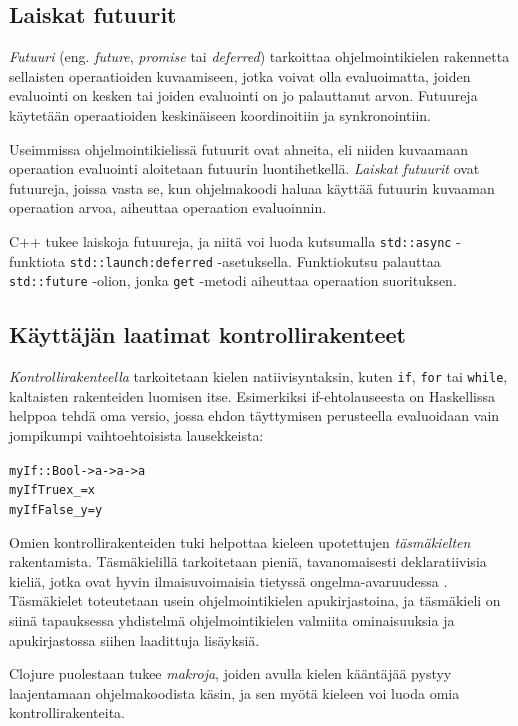 \subsection{Laiskat futuurit}
\textit{Futuuri} (eng. \textit{future}, \textit{promise} tai \textit{deferred}) tarkoittaa ohjelmointikielen rakennetta sellaisten operaatioiden kuvaamiseen, jotka voivat olla evaluoimatta, joiden evaluointi on kesken tai joiden evaluointi on jo palauttanut arvon. Futuureja käytetään operaatioiden keskinäiseen koordinoitiin ja synkronointiin.

Useimmissa ohjelmointikielissä futuurit ovat ahneita, eli niiden kuvaamaan operaation evaluointi aloitetaan futuurin luontihetkellä. \textit{Laiskat futuurit} ovat futuureja, joissa vasta se, kun ohjelmakoodi haluaa käyttää futuurin kuvaaman operaation arvoa, aiheuttaa operaation evaluoinnin.

C++ tukee laiskoja futuureja, ja niitä voi luoda kutsumalla \verb!std::async! -funktiota \verb!std::launch:deferred! -asetuksella. Funktiokutsu palauttaa \verb!std::future! -olion, jonka \verb!get! -metodi aiheuttaa operaation suorituksen.

\subsection{Käyttäjän laatimat kontrollirakenteet}

\textit{Kontrollirakenteella} tarkoitetaan kielen natiivisyntaksin, kuten \verb!if!, \verb!for! tai \verb!while!, kaltaisten rakenteiden luomisen itse. Esimerkiksi if-ehtolauseesta on Haskellissa helppoa tehdä oma versio, jossa ehdon täyttymisen perusteella evaluoidaan vain jompikumpi vaihtoehtoisista lausekkeista:

\begin{alltt}
myIf :: Bool -> a -> a -> a
myIf True  x _ = x
myIf False _ y = y
\end{alltt}

Omien kontrollirakenteiden tuki helpottaa kieleen upotettujen \textit{täsmäkielten} rakentamista. Täsmäkielillä tarkoitetaan pieniä, tavanomaisesti deklaratiivisia kieliä, jotka ovat hyvin ilmaisuvoimaisia tietyssä ongelma-avaruudessa \citep{van2000domain}. Täsmäkielet toteutetaan usein ohjelmointikielen apukirjastoina, ja täsmäkieli on siinä tapauksessa yhdistelmä ohjelmointikielen valmiita ominaisuuksia ja apukirjastossa siihen laadittuja lisäyksiä.

Clojure puolestaan tukee \textit{makroja}, joiden avulla kielen kääntäjää pystyy laajentamaan ohjelmakoodista käsin, ja sen myötä kieleen voi luoda omia kontrollirakenteita.

